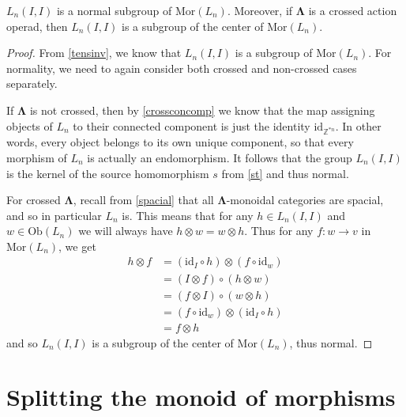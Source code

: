 \documentclass{amsbook} %
\newcommand{\id}{\textrm{id}}
\newcommand{\ML}{\mathbf{\Lambda}}
\newcommand{\MorLn}{\mathrm{Mor}(L_n)}
\numberwithin{section}{chapter}
\begin{document}
\begin{prop} \label{endnorm} $L_n(I,I)$ is a normal subgroup of $\MorLn$. Moreover, if $\ML$ is a crossed action operad, then $L_n(I,I)$ is a subgroup of the center of $\MorLn$.
\end{prop}
\begin{proof}
From \cref{tensinv}, we know that $L_n(I,I)$ is a subgroup of $\MorLn$. For normality, we need to again consider both crossed and non-crossed cases separately. 

If $\ML$ is not crossed, then by \cref{crossconcomp} we know that the map assigning objects of $L_n$ to their connected component is just the identity $\id_{\mathbb{Z}^{\ast n}}$. In other words, every object belongs to its own unique component, so that every morphism of $L_n$ is actually an endomorphism. It follows that the group $L_n(I,I)$ is the kernel of the source homomorphism $s$ from \cref{st} and thus normal.

For crossed $\ML$, recall from \cref{spacial} that all $\ML$-monoidal categories are spacial, and so in particular $L_n$ is. This means that for any $h \in L_n(I,I)$ and $w \in \mathrm{Ob}(L_n)$ we will always have $h \otimes w = w \otimes h$. Thus for any $f \colon w \rightarrow v$ in $\MorLn$, we get
  \begin{align*}
  	h \otimes f & =(\id_I \circ h) \otimes (f \circ \id_w) \\
  	&= (I \otimes f) \circ (h \otimes w) \\
  	&= (f \otimes I) \circ (w \otimes h) \\
  	&= (f \circ \id_w) \otimes (\id_I \circ h) \\
  	&= f \otimes h
  \end{align*}
and so $L_n(I,I)$ is a subgroup of the center of $\MorLn$, thus normal. 
\end{proof}

\section{Splitting the monoid of morphisms}
\end{document}
